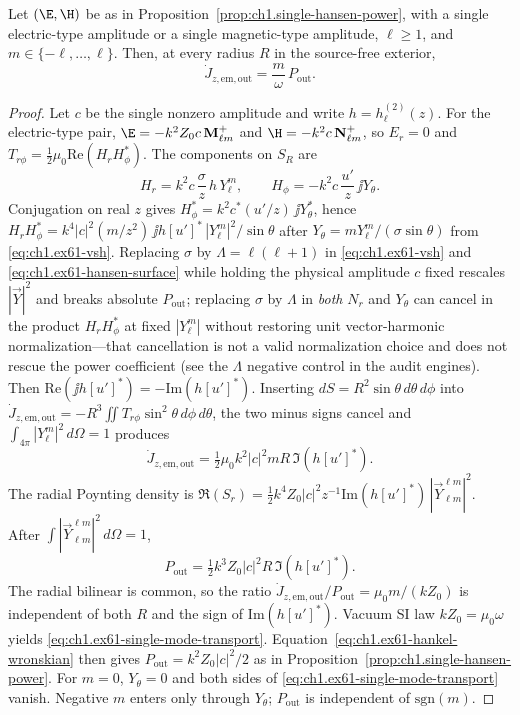 \begin{proposition}
\label{prop:ch1.single-hansen-transport}
Let $(\E,\H)$ be as in Proposition~\ref{prop:ch1.single-hansen-power}, with a single electric-type amplitude or a single magnetic-type amplitude, $\ell\ge 1$, and $m\in\{-\ell,\ldots,\ell\}$. Then, at every radius $R$ in the source-free exterior,
\begin{equation}
\label{eq:ch1.ex61-single-mode-transport}
\dot J_{z,\mathrm{em,out}}=\frac{m}{\omega}\,P_{\mathrm{out}}.
\end{equation}
\end{proposition}
\begin{proof}
Let $c$ be the single nonzero amplitude and write $h=h_\ell^{(2)}(z)$. For the electric-type pair, $\E=-k^2 Z_0 c\,\mathbf M_{\ell m}^+$ and $\H=-k^2 c\,\mathbf N_{\ell m}^+$, so $E_r=0$ and $T_{r\phi}=\tfrac12\mu_0\mathrm{Re}(H_r H_\phi^*)$. The components on $S_R$ are
\[
H_r=k^2 c\,\frac{\sigma}{z}\,h\,Y_\ell^m,\qquad
H_\phi=-k^2 c\,\frac{u'}{z}\,\jj Y_\theta.
\]
Conjugation on real $z$ gives $H_\phi^*=k^2 c^*(u'/z)\,\jj Y_\theta^*$, hence $H_r H_\phi^*=k^4|c|^2(m/z^2)\,\jj h[u']^*\,|Y_\ell^m|^2/\sin\theta$ after $Y_\theta=m Y_\ell^m/(\sigma\sin\theta)$ from \eqref{eq:ch1.ex61-vsh}. Replacing $\sigma$ by $\Lambda=\ell(\ell+1)$ in \eqref{eq:ch1.ex61-vsh} and \eqref{eq:ch1.ex61-hansen-surface} while holding the physical amplitude $c$ fixed rescales $|\vec Y|^2$ and breaks absolute $P_{\mathrm{out}}$; replacing $\sigma$ by $\Lambda$ in \emph{both} $N_r$ and $Y_\theta$ can cancel in the product $H_r H_\phi^*$ at fixed $|Y_\ell^m|$ without restoring unit vector-harmonic normalization---that cancellation is not a valid normalization choice and does not rescue the power coefficient (see the $\Lambda$ negative control in the audit engines). Then $\mathrm{Re}(\jj h[u']^*)=-\mathrm{Im}(h[u']^*)$. Inserting $dS=R^2\sin\theta\,d\theta\,d\phi$ into $\dot J_{z,\mathrm{em,out}}=-R^3\iint T_{r\phi}\sin^2\theta\,d\phi\,d\theta$, the two minus signs cancel and $\int_{4\pi}|Y_\ell^m|^2\,d\Omega=1$ produces
\[
\dot J_{z,\mathrm{em,out}}=\tfrac12\mu_0 k^2 |c|^2 m R\,\Im(h[u']^*).
\]
The radial Poynting density is $\Re(S_r)=\tfrac12 k^4 Z_0|c|^2 z^{-1}\mathrm{Im}(h[u']^*)\,|\vec Y_{\ell m}^{\ell m}|^2$. After $\int|\vec Y_{\ell m}^{\ell m}|^2\,d\Omega=1$,
\[
P_{\mathrm{out}}=\tfrac12 k^3 Z_0 |c|^2 R\,\Im(h[u']^*).
\]
The radial bilinear is common, so the ratio $\dot J_{z,\mathrm{em,out}}/P_{\mathrm{out}}=\mu_0 m/(k Z_0)$ is independent of both $R$ and the sign of $\mathrm{Im}(h[u']^*)$. Vacuum SI law $k Z_0=\mu_0\omega$ yields \eqref{eq:ch1.ex61-single-mode-transport}. Equation~\eqref{eq:ch1.ex61-hankel-wronskian} then gives $P_{\mathrm{out}}=k^2 Z_0|c|^2/2$ as in Proposition~\ref{prop:ch1.single-hansen-power}. For $m=0$, $Y_\theta=0$ and both sides of \eqref{eq:ch1.ex61-single-mode-transport} vanish. Negative $m$ enters only through $Y_\theta$; $P_{\mathrm{out}}$ is independent of $\mathrm{sgn}(m)$.


\end{proof}
